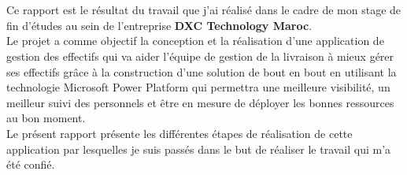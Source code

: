 \titlespacing*{\chapter}{0pt}{1.80in}{0in}
\chapter*{}
\titlespacing*{\chapter}{0pt}{0.45in}{0.3in}%
\vspace{1in}

Ce rapport est le résultat du travail que j'ai réalisé dans le cadre de mon stage de fin d'études au sein de l'entreprise \textbf{DXC Technology Maroc}.\\

Le projet a comme objectif la conception et la réalisation d'une application de gestion des effectifs qui va aider l'équipe de gestion de la livraison à mieux gérer ses effectifs grâce à la construction d'une solution de bout en bout en utilisant la technologie Microsoft Power Platform qui permettra une meilleure visibilité, un meilleur suivi des personnels et être en mesure de déployer les bonnes ressources au bon moment.\\ 

Le présent rapport présente les différentes étapes de réalisation de cette application par lesquelles je suis passés dans le but de réaliser le travail qui m'a été confié. 
